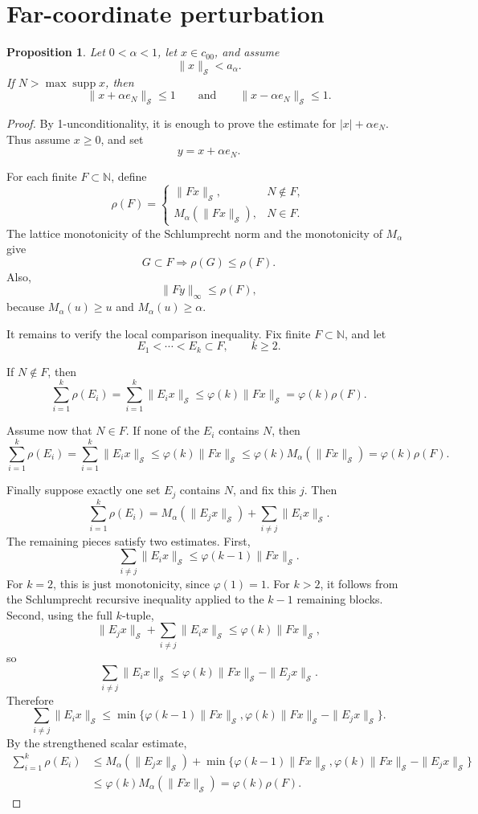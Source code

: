\documentclass[11pt]{article}
\newcommand{\ph}{\varphi}
\newcommand{\N}{\mathbb N}
\newcommand{\Ssp}{\mathcal S}
\newtheorem*{proposition*}{Proposition}
\begin{document}
\section{Far-coordinate perturbation}

\begin{proposition*}
Let \(0<\alpha<1\), let \(x\in c_{00}\), and assume
\[
 \|x\|_{\Ssp}<a_\alpha.
\]
If \(N>\max\operatorname{supp}x\), then
\[
 \|x+\alpha e_N\|_{\Ssp}\le 1
 \qquad\text{and}\qquad
 \|x-\alpha e_N\|_{\Ssp}\le 1.
\]
\end{proposition*}

\begin{proof}
By 1-unconditionality, it is enough to prove the estimate for
\(|x|+\alpha e_N\).  Thus assume \(x\ge 0\), and set
\[
 y=x+\alpha e_N.
\]

For each finite \(F\subset\N\), define
\[
 \rho(F)
 =
 \begin{cases}
 \|Fx\|_{\Ssp},& N\notin F,\\[2mm]
 M_\alpha(\|Fx\|_{\Ssp}),& N\in F.
 \end{cases}
\]
The lattice monotonicity of the Schlumprecht norm and the monotonicity of
\(M_\alpha\) give
\[
 G\subset F\Longrightarrow \rho(G)\le \rho(F).
\]
Also,
\[
 \|Fy\|_\infty\le \rho(F),
\]
because \(M_\alpha(u)\ge u\) and \(M_\alpha(u)\ge\alpha\).

It remains to verify the local comparison inequality.  Fix finite
\(F\subset\N\), and let
\[
 E_1<\cdots<E_k\subset F,
 \qquad k\ge 2.
\]

If \(N\notin F\), then
\[
 \sum_{i=1}^k \rho(E_i)
 =
 \sum_{i=1}^k \|E_i x\|_{\Ssp}
 \le
 \ph(k)\|Fx\|_{\Ssp}
 =
 \ph(k)\rho(F).
\]

Assume now that \(N\in F\).
If none of the \(E_i\) contains \(N\), then
\[
 \sum_{i=1}^k \rho(E_i)
 =
 \sum_{i=1}^k \|E_i x\|_{\Ssp}
 \le
 \ph(k)\|Fx\|_{\Ssp}
 \le
 \ph(k)M_\alpha(\|Fx\|_{\Ssp})
 =
 \ph(k)\rho(F).
\]

Finally suppose exactly one set \(E_j\) contains \(N\), and fix this \(j\).
Then
\[
 \sum_{i=1}^k \rho(E_i)
 =
 M_\alpha(\|E_jx\|_{\Ssp})+\sum_{i\ne j}\|E_i x\|_{\Ssp}.
\]
The remaining pieces satisfy two estimates.  First,
\[
 \sum_{i\ne j}\|E_i x\|_{\Ssp}\le \ph(k-1)\|Fx\|_{\Ssp}.
\]
For \(k=2\), this is just monotonicity, since \(\ph(1)=1\).  For
\(k>2\), it follows from the Schlumprecht recursive inequality applied to
the \(k-1\) remaining blocks.  Second, using the full \(k\)-tuple,
\[
 \|E_jx\|_{\Ssp}+\sum_{i\ne j}\|E_i x\|_{\Ssp}
 \le
 \ph(k)\|Fx\|_{\Ssp},
\]
so
\[
 \sum_{i\ne j}\|E_i x\|_{\Ssp}
 \le
 \ph(k)\|Fx\|_{\Ssp}-\|E_jx\|_{\Ssp}.
\]
Therefore
\[
 \sum_{i\ne j}\|E_i x\|_{\Ssp}
 \le
 \min\{\ph(k-1)\|Fx\|_{\Ssp},
          \ph(k)\|Fx\|_{\Ssp}-\|E_jx\|_{\Ssp}\}.
\]
By the strengthened scalar estimate,
\[
\begin{aligned}
 \sum_{i=1}^k \rho(E_i)
 &\le
 M_\alpha(\|E_jx\|_{\Ssp})+
 \min\{\ph(k-1)\|Fx\|_{\Ssp},
        \ph(k)\|Fx\|_{\Ssp}-\|E_jx\|_{\Ssp}\} \\
 &\le
 \ph(k)M_\alpha(\|Fx\|_{\Ssp})
 =
 \ph(k)\rho(F).
\end{aligned}
\]


\end{proof}
\end{document}
